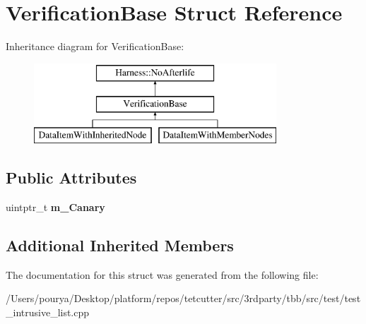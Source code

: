 \hypertarget{structVerificationBase}{}\section{Verification\+Base Struct Reference}
\label{structVerificationBase}
Inheritance diagram for Verification\+Base\+:\begin{figure}[H]
\begin{center}
\leavevmode
\includegraphics[height=3.000000cm]{structVerificationBase}
\end{center}
\end{figure}
\subsection*{Public Attributes}
\begin{DoxyCompactItemize}
\item 
\hypertarget{structVerificationBase_a9a88fe33319cefb8f46f1bfd74f025a1}{}uintptr\+\_\+t {\bfseries m\+\_\+\+Canary}\label{structVerificationBase_a9a88fe33319cefb8f46f1bfd74f025a1}

\end{DoxyCompactItemize}
\subsection*{Additional Inherited Members}


The documentation for this struct was generated from the following file\+:\begin{DoxyCompactItemize}
\item 
/\+Users/pourya/\+Desktop/platform/repos/tetcutter/src/3rdparty/tbb/src/test/test\+\_\+intrusive\+\_\+list.\+cpp\end{DoxyCompactItemize}
